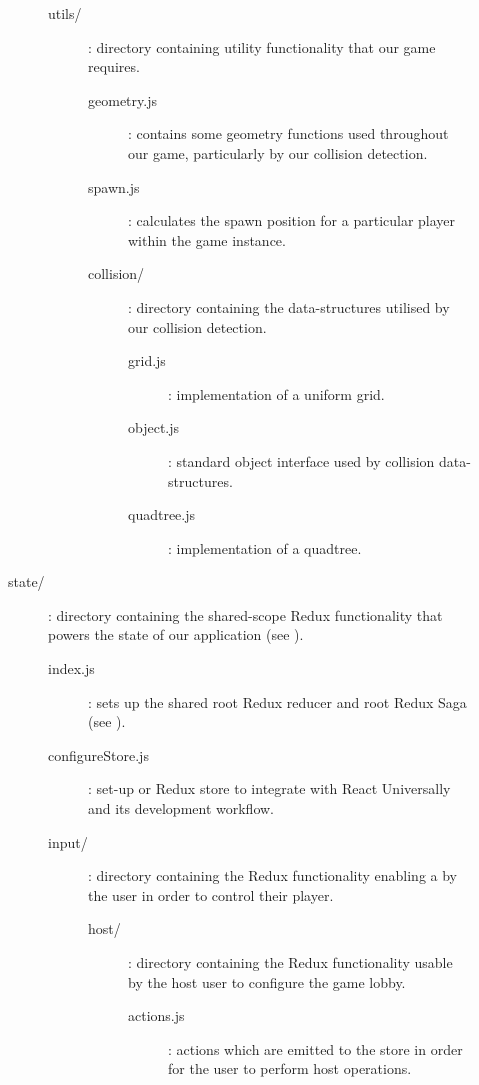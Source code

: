 \documentclass{standalone}
\begin{document}
\begin{formal}
\begin{description}
\begin{description}
\begin{description}
			      		\item[utils/]: directory containing utility functionality that our game requires.
				      	\begin{description}
			      			\item[geometry.js]: contains some geometry functions used throughout our game, particularly by our collision detection.
			      			\item[spawn.js]: calculates the spawn position for a particular player within the game instance.

			      			\item[collision/]: directory containing the data-structures utilised by our collision detection.
				      		\begin{description}
				      			\item[grid.js]: implementation of a uniform grid.
				      			\item[object.js]: standard object interface used by collision data-structures.
				      			\item[quadtree.js]: implementation of a quadtree.
				    			\end{description}
			      		\end{description}
					    \end{description}

					    \item[state/]: directory containing the shared-scope Redux functionality that powers the state of our application (see ).
					    	\begin{description}
			      			\item[index.js]: sets up the shared root Redux reducer and root Redux Saga (see ).
			      			\item[configureStore.js]: set-up or Redux store to integrate with React Universally and its development workflow.

			      			\item[input/]: directory containing the Redux functionality enabling a by the user in order to control their player.
					    		\begin{description}
				      			\item[host/]: directory containing the Redux functionality usable by the host user to configure the game lobby.
						    		\begin{description}
				      				\item[actions.js]: actions which are emitted to the store in order for the user to perform host operations.
			    					\end{description}


\end{description}
\end{description}
\end{description}
\end{description}
\end{formal}
\end{document}

